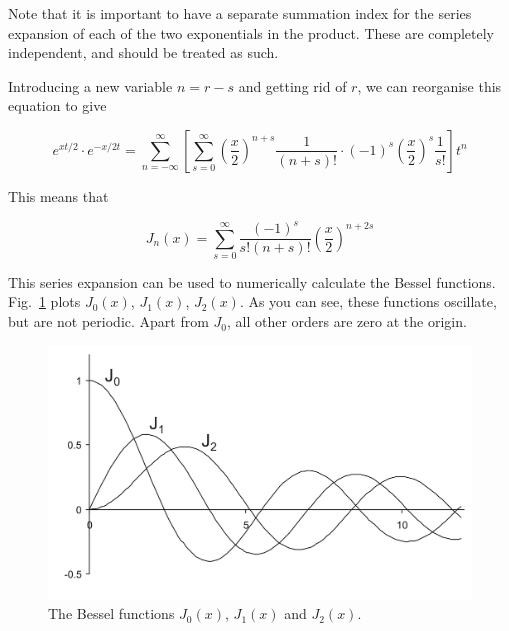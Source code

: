 Note that it is important to have a separate summation index for the series expansion of each of the two exponentials in the product. These are completely independent, and should be treated as such.

\noindent{}Introducing a new variable $n = r - s$ and getting rid of $r$, we can reorganise this equation to give

\begin{equation}
e^{xt/2} \cdot e^{-x/2t} = \sum_{n = -\infty}^{\infty} \left[ \sum_{s = 0}^{\infty} {\left(\frac{x}{2}\right)}^{n+s} \frac{1}{(n+s)!} \cdot (-1)^s {\left(\frac{x}{2}\right)}^{s} \frac{1}{s!} \right] t^n
\end{equation} 

This means that

\begin{equation}
J_n(x) = \sum_{s = 0}^{\infty} \frac {{(-1)}^s}{s!(n+s)!} {\left(\frac{x}{2}\right)}^{n+2s} \label{eq-bessel-series}
\end{equation} 

This series expansion can be used to numerically calculate the Bessel functions. Fig.~\ref{fig-bessel-J} plots $J_0(x)$, $J_1(x)$, $J_2(x)$. As you can see, these functions oscillate, but are not periodic. Apart from $J_0$, all other orders are zero at the origin.

\begin{figure}
\centering
\includegraphics{bessel/figures/j}
\caption{The Bessel functions $J_0(x)$, $J_1(x)$ and $J_2(x)$.}
\label{fig-bessel-J}
\end{figure}

